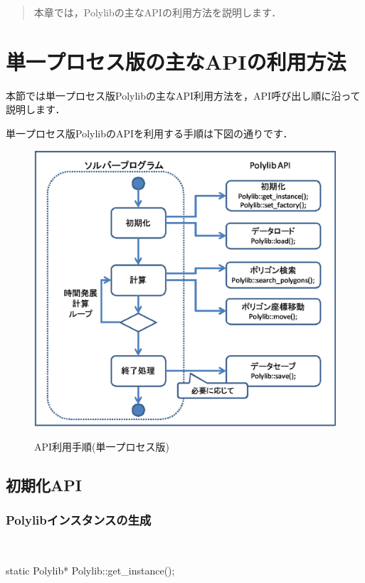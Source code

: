 {\begin{abstract}
本章では，Polylibの主なAPIの利用方法を説明します．
\end{abstract}

% 
\graphicspath{{./fig_api/}}

%
\section{単一プロセス版の主なAPIの利用方法}

本節では単一プロセス版Polylibの主なAPI利用方法を，API呼び出し順に沿って説明します．

単一プロセス版PolylibのAPIを利用する手順は下図の通りです．

\begin{figure}[H]
 \centering
 \includegraphics[width=12cm]{clip004.eps}\\
 \caption{API利用手順(単一プロセス版)}
\end{figure}

%
\subsection{初期化API}

%
\subsubsection{Polylibインスタンスの生成}
　\\

\begin{program}
	static Polylib* Polylib::get_instance();
\end{program}

}
